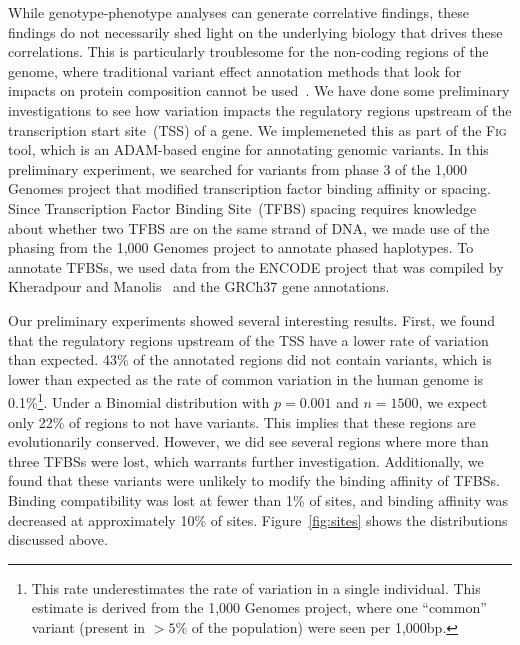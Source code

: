 \documentclass[11pt]{article} %
\begin{document}
While genotype-phenotype analyses can generate correlative findings, these findings do not
necessarily shed light on the underlying biology that drives these correlations. This is
particularly troublesome for the non-coding regions of the genome, where traditional variant
effect annotation methods that look for impacts on protein composition cannot be
used~\cite{mclaren10}. We have done some preliminary investigations to see how variation impacts
the regulatory regions upstream of the transcription start site~(TSS) of a gene. We implemeneted
this as part of the \textsc{Fig} tool, which is an \textsc{ADAM}-based engine for annotating
genomic variants. In this preliminary experiment, we searched for variants from phase 3 of the
1,000 Genomes project that modified transcription factor binding affinity or spacing. Since
Transcription Factor Binding Site~(TFBS) spacing requires knowledge about whether two TFBS are
on the same strand of DNA, we made use of the phasing from the 1,000 Genomes project to annotate
phased haplotypes. To annotate TFBSs, we used data from the ENCODE project that was compiled by
Kheradpour and Manolis~\cite{kheradpour14} and the GRCh37 gene annotations.

Our preliminary experiments showed several interesting results. First, we found that the regulatory
regions upstream of the TSS have a lower rate of variation than expected. 43\% of the annotated
regions did not contain variants, which is lower than expected as the rate of common variation
in the human genome is 0.1\%\footnote{This rate underestimates the rate of variation in a single
individual. This estimate is derived from the 1,000 Genomes project, where one ``common'' variant
(present in $>5\%$ of the population) were seen per 1,000bp.}. Under a Binomial distribution with
$p = 0.001$ and $n = 1500$, we expect only 22\% of regions to not have variants. This implies that
these regions are evolutionarily conserved. However, we did see several regions where more than
three TFBSs were lost, which warrants further investigation. Additionally, we found that these
variants were unlikely to modify the binding affinity of TFBSs. Binding compatibility was lost at
fewer than 1\% of sites, and binding affinity was decreased at approximately 10\% of sites.
Figure~\ref{fig:sites} shows the distributions discussed above.
\end{document}
